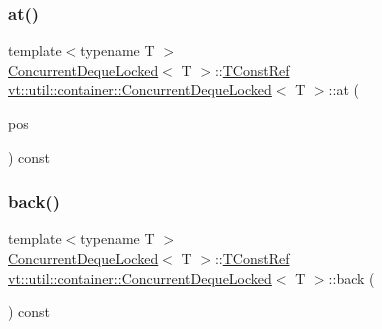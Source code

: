 \mbox{\label{structvt_1_1util_1_1container_1_1_concurrent_deque_locked_a5c5a48c3f01f61faa7329c2cbfd92103}} 
\subsubsection{\texorpdfstring{at()}{at()}\hspace{0.1cm}{\footnotesize\ttfamily [2/2]}}
{\footnotesize\ttfamily template$<$typename T $>$ \\
\hyperlink{structvt_1_1util_1_1container_1_1_concurrent_deque_locked}{Concurrent\+Deque\+Locked}$<$ T $>$\+::\hyperlink{structvt_1_1util_1_1container_1_1_concurrent_deque_locked_a9da9776dff836c013a95431f3ab15e35}{T\+Const\+Ref} \hyperlink{structvt_1_1util_1_1container_1_1_concurrent_deque_locked}{vt\+::util\+::container\+::\+Concurrent\+Deque\+Locked}$<$ T $>$\+::at (\begin{DoxyParamCaption}\item[{\hyperlink{structvt_1_1util_1_1container_1_1_concurrent_deque_locked_a6f35f4923f1329d25378656b0582e916}{Size\+Type} const \&}]{pos }\end{DoxyParamCaption}) const}

\mbox{\label{structvt_1_1util_1_1container_1_1_concurrent_deque_locked_a1722e76798cd9b6629f111814035e29a}} 
\subsubsection{\texorpdfstring{back()}{back()}\hspace{0.1cm}{\footnotesize\ttfamily [1/2]}}
{\footnotesize\ttfamily template$<$typename T $>$ \\
\hyperlink{structvt_1_1util_1_1container_1_1_concurrent_deque_locked}{Concurrent\+Deque\+Locked}$<$ T $>$\+::\hyperlink{structvt_1_1util_1_1container_1_1_concurrent_deque_locked_a9da9776dff836c013a95431f3ab15e35}{T\+Const\+Ref} \hyperlink{structvt_1_1util_1_1container_1_1_concurrent_deque_locked}{vt\+::util\+::container\+::\+Concurrent\+Deque\+Locked}$<$ T $>$\+::back (\begin{DoxyParamCaption}{ }\end{DoxyParamCaption}) const}

